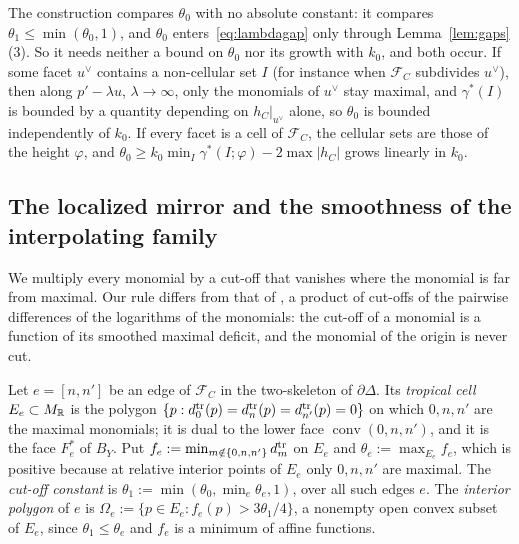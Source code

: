 \begin{remark}\label{rem:theta0}
The construction compares $\theta_0$ with no absolute constant: it compares $\theta_1\le\min(\theta_0,1)$, and $\theta_0$
enters~\eqref{eq:lambdagap} only through Lemma~\ref{lem:gaps}(3). So it needs neither a bound on $\theta_0$ nor its growth
with $k_0$, and both occur. If some facet $u^\vee$ contains a non-cellular set $I$ (for instance when $\mathcal F_C$
subdivides $u^\vee$), then along $p'-\lambda u$, $\lambda\to\infty$, only the monomials of $u^\vee$ stay maximal, and
$\gamma^*(I)$ is bounded by a quantity depending on $h_C|_{u^\vee}$ alone, so $\theta_0$ is bounded independently of $k_0$.
If every facet is a cell of $\mathcal F_C$, the cellular sets are those of the height $\varphi$, and
$\theta_0\ge k_0\min_I\gamma^*(I;\varphi)-2\max|h_C|$ grows linearly in $k_0$.
\end{remark}

\subsection{The localized mirror and the smoothness of the interpolating family}\label{ssec:localized}

We multiply every monomial by a cut-off that vanishes where the monomial is far from maximal. Our rule differs from
that of \cite[Def.~3.1]{Ya16}, a product of cut-offs of the pairwise differences of the logarithms of the monomials: the
cut-off of a monomial is a function of its smoothed maximal deficit, and the monomial of the origin is never cut.

\begin{definition}\label{def:legcell}
Let $e=[n,n']$ be an edge of $\mathcal F_C$ in the two-skeleton of $\partial\Delta$. Its \emph{tropical cell}
$E_e\subset M_\mathbb R$ is the polygon $\{p:d^{\rm tr}_0(p)=d^{\rm tr}_n(p)=d^{\rm tr}_{n'}(p)=0\}$ on which $0,n,n'$ are the
maximal monomials; it is dual to the lower face $\operatorname{conv}(0,n,n')$, and it is the face $F^*_e$ of $B_Y$. Put
$f_e:=\min_{m\notin\{0,n,n'\}}d^{\rm tr}_m$ on $E_e$ and $\theta_e:=\max_{E_e}f_e$, which is positive because at relative
interior points of $E_e$ only $0,n,n'$ are maximal. The \emph{cut-off constant} is
$\theta_1:=\min(\theta_0,\min_e\theta_e,1)$, over all such edges $e$. The \emph{interior polygon} of $e$ is
$\Omega_e:=\{p\in E_e:f_e(p)>3\theta_1/4\}$, a nonempty open convex subset of $E_e$, since $\theta_1\le\theta_e$ and $f_e$
is a minimum of affine functions.
\end{definition}

